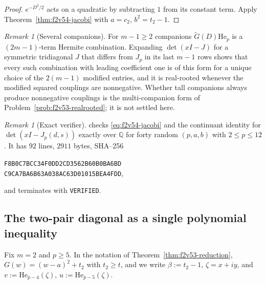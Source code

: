 \documentclass[11pt]{article}
\theoremstyle{definition}
\theoremstyle{remark}
\newtheorem{remark}[theorem]{Remark}
\begin{document}
\begin{proof}
\(e^{-D^2/2}\) acts on a quadratic by subtracting \(1\) from its constant
term.  Apply Theorem~\ref{thm:f2v54-jacobi} with \(a=c_2\),
\(b^2=t_2-1\).
\end{proof}

\begin{remark}[Several companions]
\label{rem:f2v54-several}
For \(m-1\ge2\) companions \(\widetilde G(D)\mathrm{He}_p\) is a
\((2m-1)\)-term Hermite combination.  Expanding \(\det(xI-J)\) for a
symmetric tridiagonal \(J\) that differs from \(J_p\) in its last
\(m-1\) rows shows that every such combination with leading coefficient
one is of this form for a unique choice of the \(2(m-1)\) modified
entries, and it is real-rooted whenever the modified squared couplings
are nonnegative.  Whether tall companions always produce nonnegative
couplings is the multi-companion form of
Problem~\ref{prob:f2v53-realrooted}; it is not settled here.
\end{remark}

\begin{remark}[Exact verifier]
\label{rem:f2v54-verifier-jacobi}
 checks
\eqref{eq:f2v54-jacobi} and the continuant identity for
\(\det(xI-J_p(d,s))\) exactly over \(\mathbb Q\) for forty random
\((p,a,b)\) with \(2\le p\le12\).  It has \(92\) lines, \(2911\) bytes,
SHA--256
\begin{center}
\texttt{F8B0C7BCC34F0DD2CD3562B60B0BA6BD}\\
\texttt{C9CA7BA6B63A038AC63D01015BEA4FDD},
\end{center}
and terminates with \texttt{VERIFIED}.
\end{remark}

\subsection{The two-pair diagonal as a single polynomial inequality}

Fix \(m=2\) and \(p\ge5\).  In the notation of
Theorem~\ref{thm:f2v53-reduction}, \(G(w)=(w-a)^2+t_2\) with
\(t_2\ge t\), and we write \(\beta:=t_2-1\), \(\zeta=x+iy\), and
\(v:=\mathrm{He}_{p-4}(\zeta)\), \(u:=\mathrm{He}_{p-5}(\zeta)\).
\end{document}
